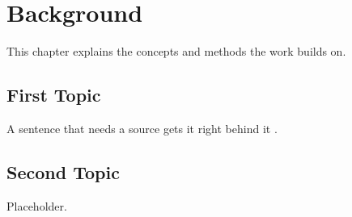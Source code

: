 
\chapter{Background}\label{ch:background}

This chapter explains the concepts and methods the work builds on.

\section{First Topic}\label{sec:background-first}

A sentence that needs a source gets it right behind it \citep{lamport1994latex}.

\section{Second Topic}\label{sec:background-second}

Placeholder.
